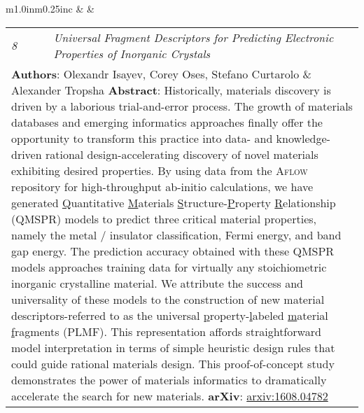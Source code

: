 \documentclass[11pt]{article}
\begin{document}
\vspace{0.25cm}

\begin{tabular}{m{1.0in}m{0.25in}c}
 & & 
\begin{tabular}{m{0.3in}m{0.15in}m{4.3in}}
\textit{\small{8}} & & \textit{Universal Fragment Descriptors for Predicting Electronic Properties of Inorganic Crystals} \\ \multicolumn{3}{p{4.75in}}{\footnotesize{\textbf{Authors}: Olexandr Isayev, \textcolor{NavyBlue}{Corey Oses}, Stefano Curtarolo \& Alexander Tropsha \newline \textbf{Abstract}: Historically, materials discovery is driven by a laborious trial-and-error process. The growth of materials databases and emerging informatics approaches finally offer the opportunity to transform this practice into data- and knowledge-driven rational design-accelerating discovery of novel materials exhibiting desired properties. By using data from the \textsc{Aflow} repository for high-throughput ab-initio calculations, we have generated \underline{Q}uantitative \underline{M}aterials \underline{S}tructure-\underline{P}roperty \underline{R}elationship (QMSPR) models to predict three critical material properties, namely the metal / insulator classification, Fermi energy, and band gap energy. The prediction accuracy obtained with these QMSPR models approaches training data for virtually any stoichiometric inorganic crystalline material. We attribute the success and universality of these models to the construction of new material descriptors-referred to as the universal \underline{p}roperty-\underline{l}abeled \underline{m}aterial \underline{f}ragments (PLMF). This representation affords straightforward model interpretation in terms of simple heuristic design rules that could guide rational materials design. This proof-of-concept study demonstrates the power of materials informatics to dramatically accelerate the search for new materials. \newline \textbf{arXiv}: \href{http://arxiv.org/abs/1608.04782}{arxiv:1608.04782}}} 
\end{tabular} \\ 
\end{tabular}

\vspace{0.25cm}
\end{document}
